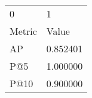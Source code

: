 \begin{tabular}{ll}
0 & 1 \\
Metric & Value \\
AP & 0.852401 \\
P@5 & 1.000000 \\
P@10 & 0.900000 \\
\end{tabular}
